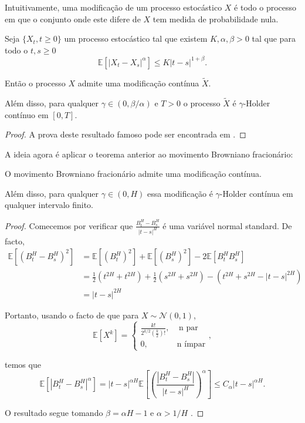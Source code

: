 \documentclass{article}
\begin{document}
\noindent Intuitivamente, uma modificação de um processo estocástico $X$ é todo o processo em que o conjunto onde este difere de $X$ tem medida de probabilidade nula. 

\vspace{0.5cm}

\begin{thm}
    Seja  $\{X_t,t \geq0\}$ um processo estocástico tal que existem $K,\alpha,\beta>0$ tal que para todo o $t,s \geq0$
    $$\mathbb{E}[|X_t-X_s|^\alpha]\leq K|t-s|^{1+\beta}.$$

    Então o processo $X$ admite uma modificação contínua $\tilde{X}$.

    Além disso, para qualquer $\gamma \in (0,\beta/\alpha)$ e $T>0$ o processo $\tilde{X}$ é $\gamma$-Holder contínuo em $[0,T]$.
\end{thm}
\begin{proof}
    A prova deste resultado famoso pode ser encontrada em \cite{Kallenberg1997}.
\end{proof}

\vspace{0.5cm}
\noindent A ideia agora é aplicar o teorema anterior ao movimento Browniano fracionário:
\vspace{0.5cm}

\begin{cor}
    O movimento Browniano fracionário admite uma modificação contínua.

    Além disso, para qualquer $\gamma \in (0,H)$ essa modificação é $\gamma$-Holder contínua em qualquer intervalo finito.
\end{cor}

\begin{proof}
    Comecemos por verificar que $\frac{B^H_t-B^H_s}{|t-s|^H}$ é uma variável normal standard. De facto,
    \begin{align*}
        \mathbb{E}[(B^H_t-B^H_s)^2]&=\mathbb{E}[(B_t^H)^2]+\mathbb{E}[(B_s^H)^2]-2\mathbb{E}[B_t^HB_s^H]\\
                                   &=\frac{1}{2}(t^{2H}+t^{2H})+\frac{1}{2}(s^{2H}+s^{2H})-(t^{2H}+s^{2H}-|t-s|^{2H})\\
                                   &=|t-s|^{2H}
    \end{align*}

    Portanto, usando o facto de que para $X \sim \mathcal{N}(0,1)$,
    $$\mathbb{E}[X^k]= \begin{cases}
        \frac{k!}{2^{k/2}(\frac{k}{2})!}, \;\;\;\; \text{n par}\\
        0, \;\;\;\;\;\;\;\;\;\;\;\;\, \text{n ímpar}
                        \end{cases},$$

    temos que $$\mathbb{E}[|B_t^H-B_s^H|^\alpha]=|t-s|^{\alpha H}\mathbb{E}\left[ \left( \frac{|B_t^H-B_s^H|}{|t-s|^H} \right)^\alpha \right]\leq C_\alpha|t-s|^{\alpha H}.$$

    O resultado segue tomando $\beta =\alpha H-1$ e  $ \alpha>1/H$ .

    

\end{proof}
\end{document}
